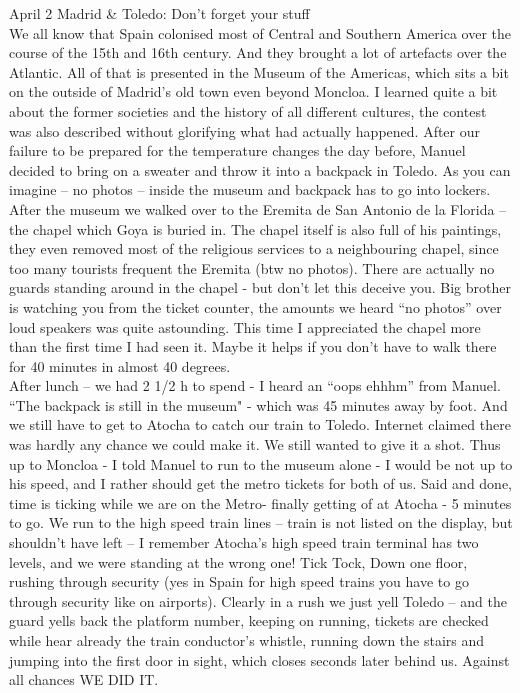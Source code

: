 April 2 
Madrid \& Toledo: Don't forget your stuff\\
We all know that Spain colonised most of Central and Southern America over the course of the 15th and 16th century. And they brought a lot of artefacts over the Atlantic. All of that is presented in the Museum of the Americas, which sits a bit on the outside of Madrid's old town even beyond Moncloa. I learned quite a bit about the former societies and the history of all different cultures, the contest was also described without glorifying what had actually happened. After our failure to be prepared for the temperature changes the day before, Manuel decided to bring on a sweater and throw it into a backpack in Toledo. As you can imagine -- no photos -- inside the museum and backpack has to go into lockers. After the museum we walked over to the Eremita de San Antonio de la Florida -- the chapel which Goya is buried in. The chapel itself is also full of his paintings, they even removed most of the religious services to a neighbouring chapel, since too many tourists frequent the Eremita (btw no photos). There are actually no guards standing around in the chapel - but don't let this deceive you. Big brother is watching you from the ticket counter, the amounts we heard ``no photos'' over loud speakers was quite astounding. This time I appreciated the chapel more than the first time I had seen it. Maybe it helps if you don't have to walk there for 40 minutes in almost 40 degrees.\\
After lunch -- we had 2 1/2 h to spend - I heard an ``oops ehhhm'' from Manuel. ``The backpack is still in the museum" - which was 45 minutes away by foot. And we still have to get to Atocha to catch our train to Toledo. Internet claimed there was hardly any chance we could make it. We still wanted to give it a shot. Thus up to Moncloa - I told Manuel to run to the museum alone - I would be not up to his speed, and I rather should get the metro tickets for both of us. Said and done, time is ticking while we are on the Metro- finally getting of at Atocha - 5 minutes to go. We run to the high speed train lines -- train is not listed on the display, but shouldn't have left -- I remember Atocha's high speed train terminal has two levels, and we were standing at the wrong one! Tick Tock, Down one floor, rushing through security (yes in Spain for high speed trains you have to go through security like on airports). Clearly in a rush we just yell Toledo -- and the guard yells back the platform number, keeping on running, tickets are checked while hear already the train conductor's whistle, running down the stairs and jumping into the first door in sight, which closes seconds later behind us. Against all chances WE DID IT.\\
